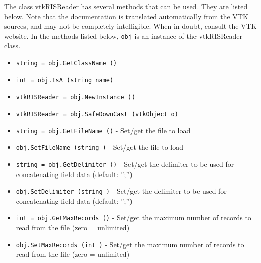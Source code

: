 The class vtkRISReader has several methods that can be used.
  They are listed below.
Note that the documentation is translated automatically from the VTK sources,
and may not be completely intelligible.  When in doubt, consult the VTK website.
In the methods listed below, \verb|obj| is an instance of the vtkRISReader class.
\begin{itemize}
\item  \verb|string = obj.GetClassName ()|

\item  \verb|int = obj.IsA (string name)|

\item  \verb|vtkRISReader = obj.NewInstance ()|

\item  \verb|vtkRISReader = obj.SafeDownCast (vtkObject o)|

\item  \verb|string = obj.GetFileName ()| -  Set/get the file to load

\item  \verb|obj.SetFileName (string )| -  Set/get the file to load

\item  \verb|string = obj.GetDelimiter ()| -  Set/get the delimiter to be used for concatenating field data (default: '';'')

\item  \verb|obj.SetDelimiter (string )| -  Set/get the delimiter to be used for concatenating field data (default: '';'')

\item  \verb|int = obj.GetMaxRecords ()| -  Set/get the maximum number of records to read from the file (zero = unlimited)

\item  \verb|obj.SetMaxRecords (int )| -  Set/get the maximum number of records to read from the file (zero = unlimited)

\end{itemize}
